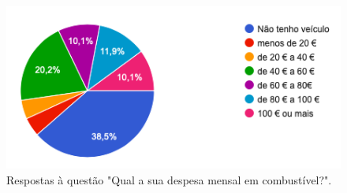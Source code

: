 \begin{figure}[H]
    \centering
	\includegraphics[scale=0.65]{imagens/g3.png}
	\caption{Respostas à questão "Qual a sua despesa mensal em combustível?".}
	\label{img:g3}
\end{figure}